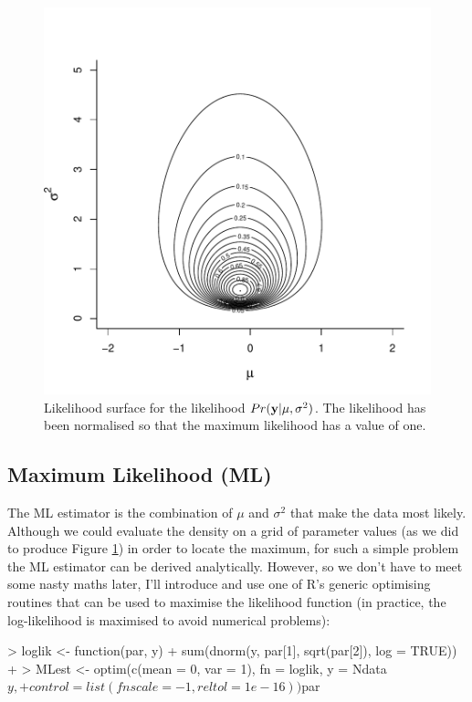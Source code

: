 \documentclass{article}
\begin{document}
\begin{figure}[!h]
\begin{center}
\includegraphics{Lecture1-015}
\end{center}
\caption{Likelihood surface for the likelihood $Pr({\bf y}|\mu, \sigma^{2})$. The likelihood has been normalised so that the maximum likelihood has a value of one.}
\label{Lsurface-fig}
\end{figure}

\subsection{Maximum Likelihood (ML)}

The ML estimator is the combination of $\mu$ and $\sigma^{2}$ that make the data most likely. Although we could evaluate the density on a grid of parameter values (as we did to produce Figure \ref{Lsurface-fig}) in order to locate the maximum, for such a simple problem the ML estimator can be derived analytically. However, so we don't have to meet some nasty maths later, I'll introduce and use one of R's generic optimising routines that can be used to maximise the likelihood function (in practice, the log-likelihood is maximised to avoid numerical problems):


\begin{Schunk}
\begin{Sinput}
> loglik <- function(par, y) {
+     sum(dnorm(y, par[1], sqrt(par[2]), log = TRUE))
+ }
> MLest <- optim(c(mean = 0, var = 1), fn = loglik, y = Ndata$y, 
+     control = list(fnscale = -1, reltol = 1e-16))$par
\end{Sinput}
\end{Schunk}
\end{document}
